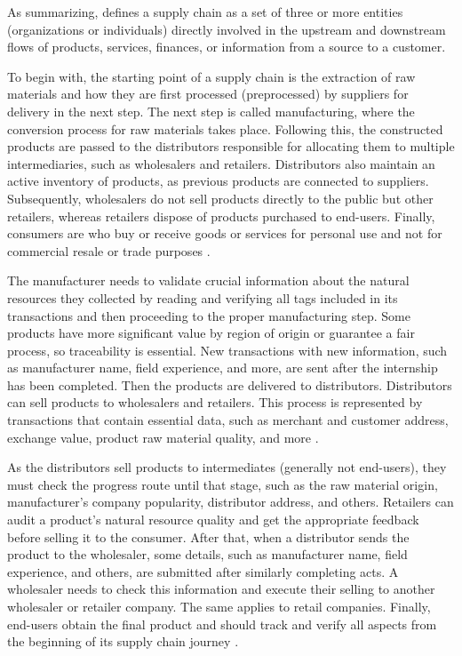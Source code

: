 As summarizing, \cite{mentzer2001defining} defines a supply chain as a set of three or more entities (organizations or individuals) directly involved in the upstream and downstream flows of products, services, finances, or information from a source to a customer. 


To begin with, the starting point of a supply chain is the extraction of raw materials and how they are first processed (preprocessed) by suppliers for delivery in the next step. The next step is called manufacturing, where the conversion process for raw materials takes place. Following this, the constructed products are passed to the distributors responsible for allocating them to multiple intermediaries, such as wholesalers and retailers. Distributors also maintain an active inventory of products, as previous products are connected to suppliers. Subsequently, wholesalers do not sell products directly to the public but other retailers, whereas retailers dispose of products purchased to end-users. Finally, consumers are who buy or receive goods or services for personal use and not for commercial resale or trade purposes \cite{litke2019blockchains}.

The manufacturer needs to validate crucial information about the natural resources they collected by reading and verifying all tags included in its transactions and then proceeding to the proper manufacturing step. Some products have more significant value by region of origin or guarantee a fair process, so traceability is essential. New transactions with new information, such as manufacturer name, field experience, and more, are sent after the internship has been completed. Then the products are delivered to distributors. Distributors can sell products to wholesalers and retailers. This process is represented by transactions that contain essential data, such as merchant and customer address, exchange value, product raw material quality, and more \cite{sauer2018extending}. 

As the distributors sell products to intermediates (generally not end-users), they must check the progress route until that stage, such as the raw material origin, manufacturer's company popularity, distributor address, and others. Retailers can audit a product's natural resource quality and get the appropriate feedback before selling it to the consumer.   After that,  when a distributor sends the product to the wholesaler, some details, such as manufacturer name, field experience, and others, are submitted after similarly completing acts. A wholesaler needs to check this information and execute their selling to another wholesaler or retailer company. The same applies to retail companies. Finally, end-users obtain the final product and should track and verify all aspects from the beginning of its supply chain journey \cite{litke2019blockchains}. 


